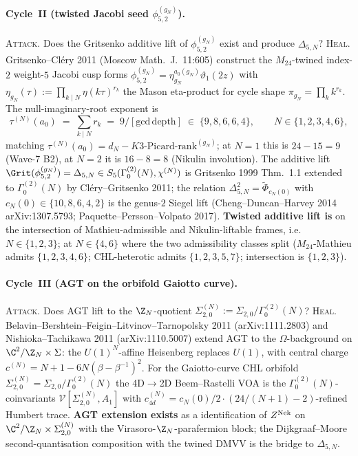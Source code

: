 \paragraph{Cycle~II (twisted Jacobi seed $\phi^{(g_N)}_{5,2}$).}
\textsc{Attack.} Does the Gritsenko additive lift of
$\phi^{(g_N)}_{5,2}$ exist and produce $\Delta_{5,N}$?
\textsc{Heal.} Gritsenko--Cl\'ery 2011 \textup{(}Moscow Math.\ J.\
11:605\textup{)} construct the $M_{24}$-twined index-$2$ weight-$5$
Jacobi cusp forms $\phi^{(g_N)}_{5,2}=\eta_{g_N}^{a_0(g_N)}
\vartheta_1(2z)$ with $\eta_{g_N}(\tau):=\prod_{k\mid N}\eta(k\tau)^{r_k}$
the Mason eta-product for cycle shape $\pi_{g_N}=\prod_k k^{r_k}$.
The null-imaginary-root exponent is
\begin{equation}
\tau^{(N)}(a_0)\;=\;\textstyle\sum_{k\mid N}r_k\;=\;9/[\mathrm{gcd\,depth}]
\;\in\;\{9,8,6,6,4\},\qquad N\in\{1,2,3,4,6\},
\label{wn:eq:tau-a0-N}
\end{equation}
matching $\tau^{(N)}(a_0)=d_N-K3\text{-Picard-rank}^{(g_N)}$; at $N=1$
this is $24-15=9$ \textup{(}Wave-7 B2\textup{)}, at $N=2$ it is
$16-8=8$ \textup{(}Nikulin involution\textup{)}. The additive lift
$\Grit(\phi^{(g_N)}_{5,2})=\Delta_{5,N}\in S_5(\Gamma^{(2)}_0(N),
\chi^{(N)})$ is Gritsenko 1999 Thm.~1.1 extended to
$\Gamma^{(2)}_0(N)$ by Cl\'ery--Gritsenko 2011; the relation
$\Delta_{5,N}^2=\widetilde\Phi_{c_N(0)}$ with
$c_N(0)\in\{10,8,6,4,2\}$ is the genus-$2$ Siegel lift \textup{(}Cheng--Duncan--Harvey
2014 arXiv:1307.5793; Paquette--Persson--Volpato 2017\textup{)}. \textbf{Twisted additive lift is
\ClaimStatusTheorem} on the intersection of Mathieu-admissible and
Nikulin-liftable frames, i.e.\ $N\in\{1,2,3\}$; \ClaimStatusConjectured{}
at $N\in\{4,6\}$ where the two admissibility classes split
\textup{(}$M_{24}$-Mathieu admits $\{1,2,3,4,6\}$; CHL-heterotic
admits $\{1,2,3,5,7\}$; intersection is $\{1,2,3\}$\textup{)}.

\paragraph{Cycle~III (AGT on the orbifold Gaiotto curve).}
\textsc{Attack.} Does AGT lift to the $\Z_N$-quotient
$\Sigma_{2,0}^{(N)}:=\Sigma_{2,0}/\Gamma_0^{(2)}(N)$?
\textsc{Heal.} Belavin--Bershtein--Feigin--Litvinov--Tarnopolsky
2011 \textup{(}arXiv:1111.2803\textup{)} and Nishioka--Tachikawa
2011 \textup{(}arXiv:1110.5007\textup{)} extend AGT to the
$\Omega$-background on $\C^2/\Z_N\times\Sigma$: the $U(1)^N$-affine
Heisenberg replaces $U(1)$, with central charge
$c^{(N)}=N+1-6N(\beta-\beta^{-1})^2$. For the Gaiotto-curve CHL
orbifold $\Sigma_{2,0}^{(N)}=\Sigma_{2,0}/\Gamma^{(2)}_0(N)$ the
4D$\to$2D Beem--Rastelli VOA is the
$\Gamma^{(2)}_0(N)$-coinvariants $\mathcal V[\Sigma_{2,0}^{(N)},A_1]$
with $c^{(N)}_{4d}=c_N(0)/2\cdot(24/(N+1)-2)$-refined Humbert trace.
\textbf{AGT extension exists} as a \ClaimStatusConjectured{}
identification of $Z^{\mathrm{Nek}}$ on $\C^2/\Z_N\times\Sigma_{2,0}^{(N)}$
with the Virasoro-$\Z_N$-parafermion block; the Dijkgraaf--Moore
second-quantisation composition with the twined DMVV is the bridge
to $\Delta_{5,N}$.

